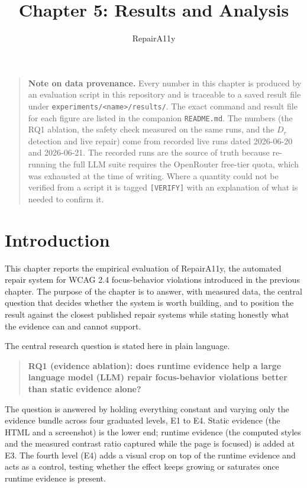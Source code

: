 \documentclass[11pt]{article}
\title{Chapter 5: Results and Analysis}
\author{RepairA11y}
\date{}
\newcommand{\Dr}{\ensuremath{D_r}}
\begin{document}
\maketitle

\begin{quote}
\textbf{Note on data provenance.} Every number in this chapter is produced by an
evaluation script in this repository and is traceable to a saved result file under
\texttt{experiments/<name>/results/}. The exact command and result file for each
figure are listed in the companion \texttt{README.md}. The numbers (the RQ1
ablation, the safety check measured on the same runs, and the \Dr{} detection and
live repair) come from recorded live runs dated 2026-06-20 and 2026-06-21. The
recorded runs are the source of truth because re-running the full LLM suite requires
the OpenRouter free-tier quota, which was exhausted at the time of writing. Where a
quantity could not be verified from a script it is tagged \texttt{[VERIFY]} with an
explanation of what is needed to confirm it.
\end{quote}

\section{Introduction}

This chapter reports the empirical evaluation of RepairA11y, the automated repair
system for WCAG 2.4 focus-behavior violations introduced in the previous chapter.
The purpose of the chapter is to answer, with measured data, the central question
that decides whether the system is worth building, and to position the result against
the closest published repair systems while stating honestly what the evidence can and
cannot support.

The central research question is stated here in plain language.

\begin{quote}
\textbf{RQ1 (evidence ablation): does runtime evidence help a large language model
(LLM) repair focus-behavior violations better than static evidence alone?}
\end{quote}

The question is answered by holding everything constant and varying only the evidence
bundle across four graduated levels, E1 to E4. Static evidence (the HTML and a
screenshot) is the lower end; runtime evidence (the computed styles and the measured
contrast ratio captured while the page is focused) is added at E3. The fourth level
(E4) adds a visual crop on top of the runtime evidence and acts as a control, testing
whether the effect keeps growing or saturates once runtime evidence is present.
\end{document}
